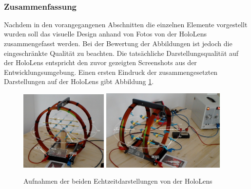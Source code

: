 \vspace{8px}
\begin{center}
	\\
\end{center}
\vspace{6px}

\subsubsection{Zusammenfassung}
Nachdem in den vorangegangenen Abschnitten die einzelnen Elemente vorgestellt wurden soll das visuelle Design anhand von Fotos von der HoloLens zusammengefasst werden. Bei der Bewertung der Abbildungen ist jedoch die eingeschränkte Qualität zu beachten. Die tatsächliche Darstellungsqualität auf der HoloLens entspricht den zuvor gezeigten Screenshots aus der Entwicklungsumgebung. Einen ersten Eindruck der zusammengesetzten Darstellungen auf der HoloLens gibt Abbildung \ref{img:hl_ss_intro}.\\

\begin{figure}[h!]
	\centering
	\includegraphics[width=0.39\textwidth]{images/HL/fieldlines.jpg}
	\hspace{0.01\textwidth}
	\includegraphics[width=0.55\textwidth]{images/HL/Vektoren.jpg}
	\caption{Aufnahmen der beiden Echtzeitdarstellungen von der HoloLens }
	\label{img:hl_ss_intro}
\end{figure}

